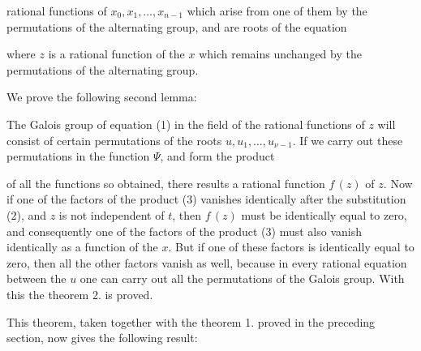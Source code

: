 rational functions of $x_0, x_1, \ldots, x_{n-1}$ which arise from one of
them by the permutations of the alternating group, and are roots of the
equation


where $z$ is a rational function of the $x$ which remains unchanged by the
permutations of the alternating group.

We prove the following second lemma:




The Galois group of equation (1) in the field of the rational functions of
$z$ will consist of certain permutations of the roots
$u, u_1, \ldots, u_{\nu-1}$. If we carry out these permutations in the
function $\Psi$, and form the product


of all the functions so obtained, there results a rational function
$f\,(z)$ of $z$. Now if one of the factors of the product (3) vanishes
identically after the substitution (2), and $z$ is not independent of $t$,
then $f\,(z)$ must be identically equal to zero, and consequently one of
the factors of the product (3) must also vanish identically as a function
of the $x$. But if one of these factors is identically equal to zero, then
all the other factors vanish as well, because in every rational equation
between the $u$ one can carry out all the permutations of the Galois
group. With this the theorem 2. is proved.

This theorem, taken together with the theorem 1. proved in the preceding
section, now gives the following result:

